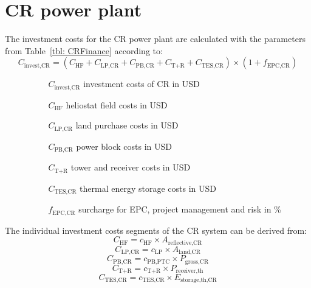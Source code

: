 \section{CR power plant}
The investment costs for the CR power plant are calculated with the parameters from Table~\ref{tbl: CRFinance} according to:
\begin{equation}                                                                                                 
C_{\text{invest,CR}} = (C_{\text{HF}}+C_{\text{LP,CR}}+C_{\text{PB,CR}}+C_{\text{T+R}}+C_{\text{TES,CR}})\times(1+f_{\text{EPC,CR}}) \label{GL_CRInvest}
\end{equation} 
\begin{itemize}
\item[ ] 
\begin{itemize}
\item[ ] 
\begin{itemize}
\item[$C_{\text{invest,CR}}$]investment costs of CR in USD
\item[$C_{\text{HF}}$]heliostat field costs in USD
\item[$C_{\text{LP,CR}}$]land purchase costs in USD
\item[$C_{\text{PB,CR}}$]power block costs in USD
\item[$C_{\text{T+R}}$]tower and receiver costs in USD
\item[$C_{\text{TES,CR}}$]thermal energy storage costs in USD
\item[$f_{\text{EPC,CR}}$]surcharge for EPC, project management and risk in \%
\end{itemize}
\end{itemize}
\end{itemize}
The individual investment costs segments of the CR system can be derived from:
\begin{equation}
C_{\text{HF}} = c_{\text{HF}} \times A_{\text{reflective,CR}}
\end{equation} 
\begin{equation}
C_{\text{LP,CR}} = c_{\text{LP}} \times A_{\text{land,CR}}
\end{equation} 
\begin{equation}
C_{\text{PB,CR}} = c_{\text{PB,PTC}} \times P_{\text{gross,CR}}
\end{equation} 
\begin{equation}
C_{\text{T+R}} = c_{\text{T+R}} \times P_{\text{receiver,th}}
\end{equation} 
\begin{equation}
C_{\text{TES,CR}} = c_{\text{TES,CR}} \times E_{\text{storage,th,CR}}
\end{equation} 
